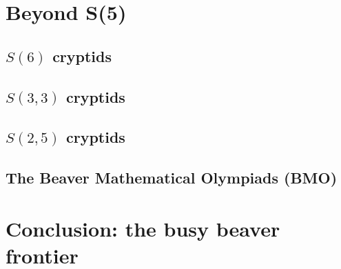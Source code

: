 \documentclass[a4paper,british]{article}
\theoremstyle{definition} %
\numberwithin{equation}{section}
\theoremstyle{definition} %
\begin{document}
\section{Beyond S(5)}
\subsection{$S(6)$ cryptids}
\subsection{$S(3,3)$ cryptids}
\subsection{$S(2,5)$ cryptids}
\subsection{The Beaver Mathematical Olympiads (BMO)}

\section{Conclusion: the busy beaver frontier}


\newpage

\end{document}
